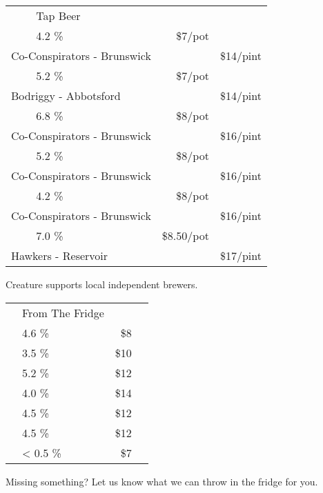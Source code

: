\documentclass[12pt]{article}
\makeatletter
\newcommand*\ColText[1]{\textcolor{SpringGreen4}{#1}}
\newcommand*\GroupGlassTitle[2]{%
  \noalign{\vspace{2em}}
  \fontfamily{qzc}\selectfont #2 & \vspace{1em}\fontsize{20}{29}\selectfont\ColText{#1}}
\newenvironment{Group}
  {\vspace{2em}\noindent\begin{tabular*}{\textwidth}{@{} p{10mm} l@{\extracolsep{\fill}} r@{\hspace{1em}} r@{}}} %
  {\end{tabular*}}
\newcommand*\Booze[3]{%
  \noalign{\vspace{1em}}
  \multicolumn{2}{l}{ #1 \tiny\dotfill } & \scriptsize #2 \% \tiny\dotfill & \normalsize \$#3}
\newcommand*\Beer[5]{%
  \noalign{\vspace{2em}}
  \Booze{#1}{#3}{#4\tiny/pot} \\
  \multicolumn{2}{l}{ \hspace*{0.1em} \scriptsize #2 } & {} & \normalsize \$#5\tiny/pint}
\newcommand*\Glass[2]{%
    \begin{tikzpicture}[remember picture,overlay]
        \node[xshift=5mm,yshift=0mm]{%
            \texttt{[image: Glasses/\#1.png]}
        };
    \end{tikzpicture}%
}
\newcommand*\GlassWeizen{%
    \Glass{weizen}{4mm}}
\newcommand*\GlassFridge{%
    \Glass{fridge}{7.5mm}}
\makeatother
\begin{document}
%


\begin{Group}
    \GroupGlassTitle{Tap Beer}{\GlassWeizen} \\
    \Beer{The Tippler \bf XPA}{Co-Conspirators - Brunswick}{4.2}{7}{14} \\
    \Beer{Blinker \bf Dark Ale}{Bodriggy - Abbotsford}{5.2}{7}{14} \\
    \Beer{The Henchman \bf WC IPA}{Co-Conspirators - Brunswick}{6.8}{8}{16} \\
    \Beer{The Beekeeper \bf Choc Honeycomb Porter}{Co-Conspirators - Brunswick}{5.2}{8}{16} \\
    \Beer{The Wheelman \bf Raspberry Gose}{Co-Conspirators - Brunswick}{4.2}{8}{16} \\
    \Beer{Beneath the Trees, We Gather \bf Yuzu \& Plum Sour}{Hawkers - Reservoir}{7.0}{8.50}{17} \\
\end{Group}
\vfill
\begin{center}
	Creature supports local independent brewers.
\end{center}
\pagebreak


\begin{Group}
    \GroupGlassTitle{From The Fridge}{\GlassFridge} \\
    \Booze{Melbourne Bitter }{4.6}{8} \\
    \Booze{Bodriggy Speccy Juice \bf Hazy Session IPA}{3.5}{10} \\
    \Booze{Stomping Ground \bf Pale Ale}{5.2}{12} \\
    \Booze{Lick Pier \bf Alcoholic Ginger Beer}{4.0}{14} \\
    \Booze{Sopra Sicilian \bf Blood Orange Seltzer \tiny(gf)}{4.5}{12} \\
    \Booze{Sopra Sicilian \bf Limoncello Seltzer \tiny(gf)}{4.5}{12} \\
    \Booze{Hop Nation Mind Ya Head \bf Non Alcoholic XPA}{< 0.5}{7} \\
\end{Group}
\vfill
\begin{center}
	Missing something? Let us know what we can throw in the fridge for you.
\end{center}
\pagebreak
\end{document}
